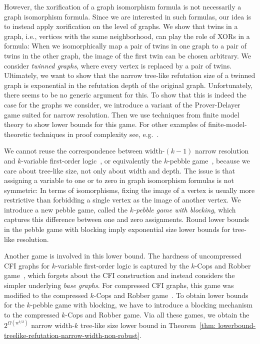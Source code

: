 \documentclass[10pt,a4paper]{article}
\begin{document}
However, the xorification of a graph isomorphism formula is not necessarily a graph isomorphism formula. Since we are interested in such formulas,
our idea is to instead apply xorification on the level of graphs. We show that twins in a graph, i.e., vertices with the same neighborhood, can play the role of XORs in a formula:
When we isomorphically map a pair of twins in one graph to a pair of twins in the other graph, the image of the first twin can be chosen arbitrary.
We consider \emph{twinned graphs}, where  every vertex is replaced by a pair of twins.
Ultimately, we want to show that the narrow tree-like refutation size  of a twinned graph is exponential in the refutation depth of the original graph.
Unfortunately, there seems to be no generic argument for this.
To show that this is indeed the case for the graphs we consider,
we introduce a variant of the Prover-Delayer game suited for narrow resolution.
Then we use techniques from finite model theory to show lower bounds for this game.
For other examples of 
%
finite-model-theoretic techniques in proof complexity see,
e.g.~\cite{Berkholz2012,DBLP:journals/jcss/AtseriasD08,GradelGPP2019}.

We cannot reuse the correspondence between width-$(k-1)$ narrow resolution and $k$\nobreakdash-variable
 first-order logic~\cite{DBLP:journals/tocl/ToranW23}, or equivalently the $k$-pebble game~\cite{DBLP:journals/jcss/Immerman82},
because we care about tree-like size, not only about width and depth.
The issue is that assigning a variable to one or to zero in graph isomorphism formulas is not symmetric: In terms of isomorphisms,
fixing the image of a vertex is usually more restrictive than forbidding a single vertex as the image of another vertex.
%
%
We introduce a new pebble game, called the \emph{$k$-pebble game with blocking}, which captures this difference between one and zero assignments.
%
%
Round lower bounds in the pebble game with blocking imply
%
exponential size lower bounds for tree-like resolution.

Another game is involved in this lower bound.
The hardness of uncompressed CFI graphs for $k$-variable first-order logic
is captured by the $k$-Cops and Robber game~\cite{SeymourThomas93, DBLP:conf/focs/GroheLNS23},
which forgets about the CFI construction and instead considers the simpler underlying \emph{base graphs}.
For compressed CFI graphs, this game was modified to the compressed $k$-Cops and Robber game~\cite{DBLP:conf/focs/GroheLNS23}.
To obtain lower bounds for the $k$-pebble game with blocking,
we have to introduce a blocking mechanism to the compressed $k$-Cops and Robber game. 
Via all these games, we obtain the 
$2^{\Omega(n^{k/2})}$ narrow width-$k$ tree-like size lower bound in Theorem~\ref{thm: lowerbound-treelike-refutation-narrow-width-non-robust}.
\end{document}
